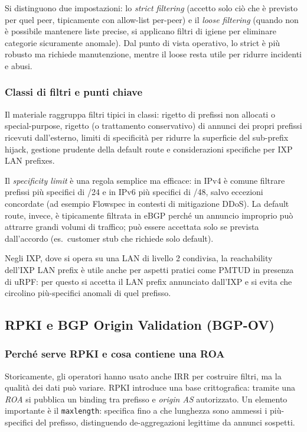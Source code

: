 Si distinguono due impostazioni: lo \emph{strict filtering} (accetto solo ciò che è previsto per quel peer, tipicamente con allow-list per-peer) e il \emph{loose filtering} (quando non è possibile mantenere liste precise, si applicano filtri di igiene per eliminare categorie sicuramente anomale). Dal punto di vista operativo, lo strict è più robusto ma richiede manutenzione, mentre il loose resta utile per ridurre incidenti e abusi.

\subsubsection{Classi di filtri e punti chiave}
Il materiale raggruppa filtri tipici in classi: rigetto di prefissi non allocati o special-purpose, rigetto (o trattamento conservativo) di annunci dei propri prefissi ricevuti dall’esterno, limiti di specificità per ridurre la superficie del sub-prefix hijack, gestione prudente della default route e considerazioni specifiche per IXP LAN prefixes.

Il \emph{specificity limit} è una regola semplice ma efficace: in IPv4 è comune filtrare prefissi più specifici di /24 e in IPv6 più specifici di /48, salvo eccezioni concordate (ad esempio Flowspec in contesti di mitigazione DDoS). La default route, invece, è tipicamente filtrata in eBGP perché un annuncio improprio può attrarre grandi volumi di traffico; può essere accettata solo se prevista dall’accordo (es.\ customer stub che richiede solo default).

Negli IXP, dove si opera su una LAN di livello 2 condivisa, la reachability dell’IXP LAN prefix è utile anche per aspetti pratici come PMTUD in presenza di uRPF: per questo si accetta il LAN prefix annunciato dall’IXP e si evita che circolino più-specifici anomali di quel prefisso.

\subsection{RPKI e BGP Origin Validation (BGP-OV)}

\subsubsection{Perché serve RPKI e cosa contiene una ROA}
Storicamente, gli operatori hanno usato anche IRR per costruire filtri, ma la qualità dei dati può variare. RPKI introduce una base crittografica: tramite una \emph{ROA} si pubblica un binding tra prefisso e \emph{origin AS} autorizzato. Un elemento importante è il \texttt{maxlength}: specifica fino a che lunghezza sono ammessi i più-specifici del prefisso, distinguendo de-aggregazioni legittime da annunci sospetti.

